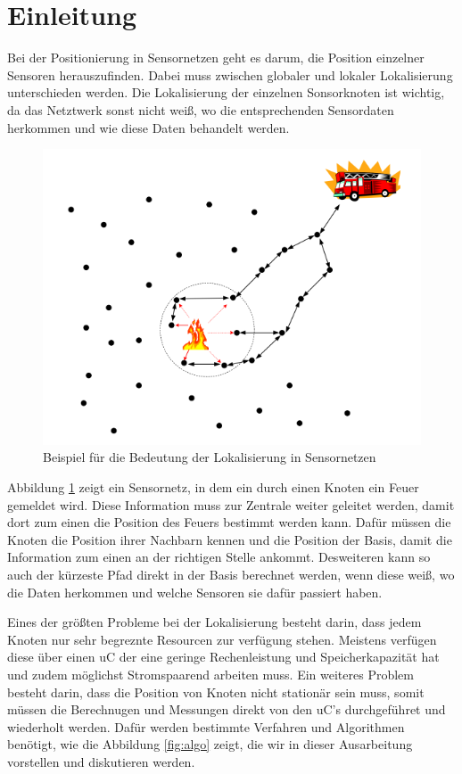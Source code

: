 \section{Einleitung}
\label{sec:einleitiung}

Bei der Positionierung in Sensornetzen geht es darum, die Position
einzelner Sensoren herauszufinden. Dabei muss zwischen globaler und
lokaler Lokalisierung unterschieden werden. Die Lokalisierung der
einzelnen Sonsorknoten ist wichtig, da das Netztwerk sonst nicht weiß,
wo die entsprechenden Sensordaten herkommen und wie diese Daten
behandelt werden.

\begin{figure}[h!]
  \centering
  \includegraphics[scale=0.6]{img/lokalisierung_1}

  \caption{Beispiel für die Bedeutung der Lokalisierung in
    Sensornetzen}
  \label{fig:local}
\end{figure}

Abbildung \ref{fig:local} zeigt ein Sensornetz, in dem ein durch einen
Knoten ein Feuer gemeldet wird. Diese Information muss zur Zentrale
weiter geleitet werden, damit dort zum einen die Position des Feuers
bestimmt werden kann. Dafür müssen die Knoten die Position ihrer
Nachbarn kennen und die Position der Basis, damit die Information zum
einen an der richtigen Stelle ankommt. Desweiteren kann so auch der
kürzeste Pfad direkt in der Basis berechnet werden, wenn diese weiß,
wo die Daten herkommen und welche Sensoren sie dafür passiert haben.
\cite{gholami2011} 

Eines der größten Probleme bei der Lokalisierung besteht darin, dass
jedem Knoten nur sehr begreznte Resourcen zur verfügung stehen.
Meistens verfügen diese über einen \ac{uC} der eine geringe
Rechenleistung und Speicherkapazität hat und zudem möglichst
Stromspaarend arbeiten muss. \cite{timmermann} Ein weiteres Problem
besteht darin, dass die Position von Knoten nicht stationär sein muss,
somit müssen die Berechnugen und Messungen direkt von den \ac{uC}'s
durchgeführet und wiederholt werden. \cite{roehrig2009} Dafür werden
bestimmte Verfahren und Algorithmen benötigt, wie die Abbildung
\ref{fig:algo} zeigt, die wir in dieser Ausarbeitung vorstellen und
diskutieren werden.

